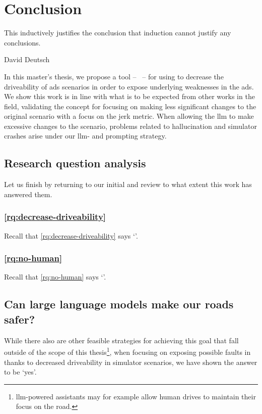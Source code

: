 \chapter{Conclusion}\label{chp:conclusion}

\epigraph{This inductively justifies the conclusion that induction cannot justify any conclusions.}{David Deutsch}

In this master's thesis, we propose a tool -- \hefe{}~-- for using  to decrease the
driveability of \acrfull{ads} scenarios in order to expose underlying weaknesses in the
\acrshort{ads}. We show this work is in line with what is to be expected from other works in the
field, validating the concept for focusing on making less significant changes to the original
scenario with a focus on the jerk metric. When allowing the \acrshort{llm} to make excessive changes
to the scenario, problems related to hallucination and simulator crashes arise under our
\acrshort{llm}- and prompting strategy.

\section{Research question analysis}

Let us finish by returning to our initial  and review to what
extent this work has answered them.

\subsection{\ref{rq:decrease-driveability}}

Recall that \ref{rq:decrease-driveability} says `'.

\subsection{\ref{rq:no-human}}

Recall that \ref{rq:no-human} says `'.


\section{Can large language models make our roads safer?}

While there also are other feasible strategies
for achieving this goal that fall outside of the scope of this
thesis\footnote{\acrshort{llm}-powered assistants may for example allow human drives to maintain
    their focus on the road.}, when focusing on exposing possible faults in  thanks to
decreased driveability in simulator scenarios, we have shown the answer to be `yes'.